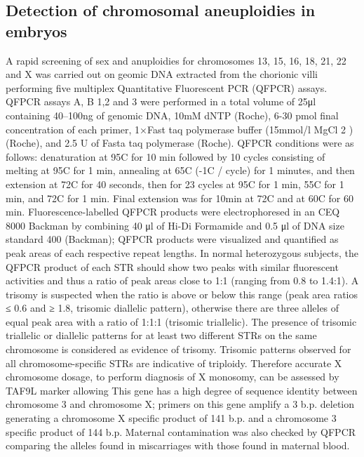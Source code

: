 \subsection*{Detection of chromosomal aneuploidies in embryos} 
A rapid screening of sex and anuploidies for chromosomes 13, 15, 16, 18, 21, 22 and X was carried out on geomic DNA extracted from the chorionic villi performing five multiplex Quantitative Fluorescent PCR (QFPCR) assays. QFPCR assays A, B 1,2 and 3 were performed in a total volume of 25μl containing 40–100ng of genomic DNA, 10mM dNTP (Roche), 6-30 pmol final concentration of each primer, 1×Fast taq polymerase buffer (15mmol/l MgCl 2 ) (Roche), and 2.5 U of Fasta taq polymerase (Roche). QFPCR conditions were as follows: denaturation at 95\textdegree C for 10 min followed by 10 cycles consisting of melting at 95\textdegree C for 1 min, annealing at 65\textdegree C (-1\textdegree C / cycle) for 1 minutes, and then extension at 72\textdegree C for 40 seconds, then for 23 cycles at 95\textdegree C for 1 min, 55\textdegree C for 1 min, and 72\textdegree C for 1 min. Final extension was for 10min at 72\textdegree C and at 60\textdegree C for 60 min. Fluorescence-labelled QFPCR products were electrophoresed in an CEQ 8000 Backman by combining 40 μl of Hi-Di Formamide and 0.5 μl of DNA size standard 400 (Backman); QFPCR products were visualized and quantified as peak areas of each respective repeat lengths. In normal heterozygous subjects, the QFPCR product of each STR should show two peaks with similar fluorescent activities and thus a ratio of peak areas close to 1:1 (ranging from 0.8 to 1.4:1). A trisomy is suspected when the ratio is  above or below this range (peak area ratios ≤ 0.6 and ≥ 1.8, trisomic diallelic pattern), otherwise there are three alleles of equal peak area with a ratio of 1:1:1 (trisomic triallelic). The presence of trisomic triallelic or diallelic patterns for at least two different STRs on the same chromosome is considered as evidence of trisomy. Trisomic patterns observed for all chromosome-specific STRs are indicative of triploidy. Therefore accurate X chromosome dosage, to perform diagnosis of X monosomy, can be assessed by TAF9L marker allowing This gene has a high degree of sequence identity between chromosome 3 and chromosome X; primers on this gene amplify a 3 b.p. deletion generating a chromosome X specific product of 141 b.p. and a chromosome 3 specific product of 144 b.p. Maternal contamination was also checked by QFPCR comparing the alleles found in miscarriages with those found in maternal blood. %


